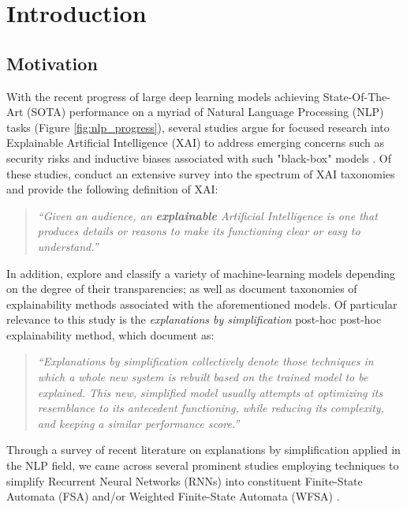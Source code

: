 \chapter{Introduction}

\label{introduction}

\section{Motivation}

With the recent progress of large deep learning models achieving State-Of-The-Art (SOTA) performance on a myriad of Natural Language Processing (NLP) tasks (Figure \ref{fig:nlp_progress}), several studies argue for focused research into Explainable Artificial Intelligence (XAI) to address emerging concerns such as security risks and inductive biases associated with such "black-box" models \citep{doran2017does,townsend2019extracting,danilevsky2020survey,arrieta2020explainable}. Of these studies, \citet{arrieta2020explainable} conduct an extensive survey into the spectrum of XAI taxonomies and provide the following definition of XAI:

\begin{quote}
  \textit{``Given an audience, an \textbf{explainable} Artificial Intelligence is one that produces details or reasons to make its functioning clear or easy to understand.''}
\end{quote}

In addition, \citet{arrieta2020explainable} explore and classify a variety of machine-learning models depending on the degree of their transparencies; as well as document taxonomies of explainability methods associated with the aforementioned models. Of particular relevance to this study is the \textit{explanations by simplification} post-hoc post-hoc explainability method, which \citet{arrieta2020explainable} document as:

\begin{quote}
\textit{``Explanations by simplification collectively denote those techniques in which a whole new system is rebuilt based on the trained model to be explained. This new, simplified model usually attempts at optimizing its resemblance to its antecedent functioning, while reducing its complexity, and keeping a similar performance score.''} 
\end{quote}

Through a survey of recent literature on explanations by simplification applied in the NLP field, we came across several prominent studies employing techniques to simplify Recurrent Neural Networks (RNNs) into constituent Finite-State Automata (FSA) and/or Weighted Finite-State Automata (WFSA) \citep{schwartz2018sopa,peng2018rational,DBLP:journals/corr/abs-1905-08701,wang2019state,jiang2020cold}.

